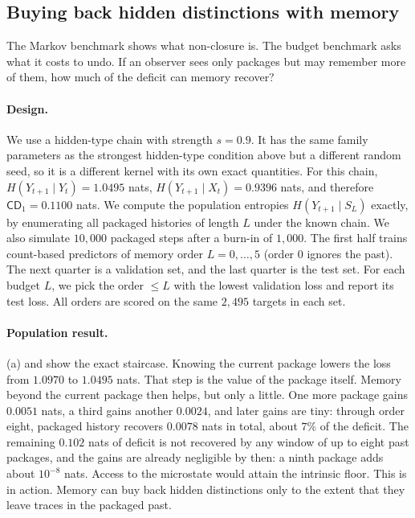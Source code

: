 \subsection{Buying back hidden distinctions with memory}\label{sec:results-budget}

The Markov benchmark shows what non-closure is. The budget benchmark asks what it costs to undo. If an observer sees only packages but may remember more of them, how much of the deficit can memory recover?

\paragraph{Design.} We use a hidden-type chain with strength $s=0.9$. It has the same family parameters as the strongest hidden-type condition above but a different random seed, so it is a different kernel with its own exact quantities. For this chain, $H(Y_{t+1}\mid Y_t)=1.0495$ nats, $H(Y_{t+1}\mid X_t)=0.9396$ nats, and therefore $\mathsf{CD}_1=0.1100$ nats. We compute the population entropies $H(Y_{t+1}\mid S_L)$ exactly, by enumerating all packaged histories of length $L$ under the known chain. We also simulate $10{,}000$ packaged steps after a burn-in of $1{,}000$. The first half trains count-based predictors of memory order $L=0,\dots,5$ (order $0$ ignores the past). The next quarter is a validation set, and the last quarter is the test set. For each budget $L$, we pick the order $\le L$ with the lowest validation loss and report its test loss. All orders are scored on the same $2{,}495$ targets in each set.

\paragraph{Population result.} (a) and  show the exact staircase. Knowing the current package lowers the loss from $1.0970$ to $1.0495$ nats. That step is the value of the package itself. Memory beyond the current package then helps, but only a little. One more package gains $0.0051$ nats, a third gains another $0.0024$, and later gains are tiny: through order eight, packaged history recovers $0.0078$ nats in total, about $7\%$ of the deficit. The remaining $0.102$ nats of deficit is not recovered by any window of up to eight past packages, and the gains are already negligible by then: a ninth package adds about $10^{-8}$ nats. Access to the microstate would attain the intrinsic floor. This is  in action. Memory can buy back hidden distinctions only to the extent that they leave traces in the packaged past.

